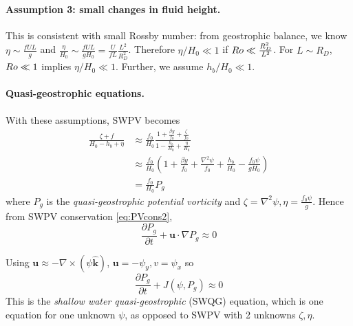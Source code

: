 \documentclass{jknotes}
\begin{document}
\paragraph{Assumption 3: small changes in fluid height.}
This is consistent with small Rossby number: from geostrophic balance, we know
$\eta \sim \frac{f UL}{g}$ and $\frac{\eta}{H_0} \sim \frac{fUL}{gH_0} =
\frac{U}{fL} \frac{L^2}{R_D^2}$. Therefore $\eta/H_0 \ll 1$ if $Ro \ll
\frac{R^2_D}{L^2}$. For $L \sim R_D$, $Ro \ll 1$ implies $\eta/H_0 \ll 1$.
Further, we assume $h_b/H_0 \ll 1$. 

\paragraph{Quasi-geostrophic equations.} With these assumptions, SWPV becomes
\begin{align}
	\frac{\zeta + f}{H_0 - h_b + \eta} &\approx \frac{f_0}{H_0} \frac{1+
		\frac{\beta y}{f_0} + \frac{\zeta}{f_0}}{1 - \frac{h_b}{H_0} +
	\frac{\eta}{H_0}} \\
	&\approx \frac{f_0}{H_0} \left(1+\frac{\beta y}{f_0} + \frac{\nabla^2
\psi}{f_0} + \frac{h_b}{H_0} - \frac{f_0 \psi}{g H_0}\right) \\
&= \frac{f_0}{H_0} P_g
\end{align}
where $P_g$ is the \emph{quasi-geostrophic potential vorticity} and $\zeta =
\nabla^2 \psi, \eta = \frac{f_0 \psi}{g}$. Hence from SWPV conservation
\eqref{eq:PVcons2},
\begin{equation}
	\frac{\partial P_g}{\partial t} + \symbf{u} \cdot \nabla P_g \approx 0
\end{equation}

Using $\symbf{u} \approx - \nabla \times (\psi \hat{\symbf{k}})$, $\symbf{u} = -\psi_y,
v = \psi_x$ so
\begin{equation}
	\frac{\partial P_g}{\partial t} + J(\psi,P_g) \approx 0\label{eq:swqg}
\end{equation}
This is the \emph{shallow water quasi-geostrophic} (SWQG) equation, which is
one equation for one unknown $\psi$, as opposed to SWPV with 2 unknowns
$\zeta, \eta$.
\end{document}
